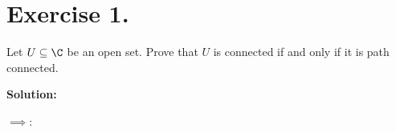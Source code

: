 \section*{Exercise 1.}
Let $U\subseteq \C$ be an open set. Prove that $U$ is connected if and only if it is path connected.

\textbf{Solution:} 

$\implies$:  